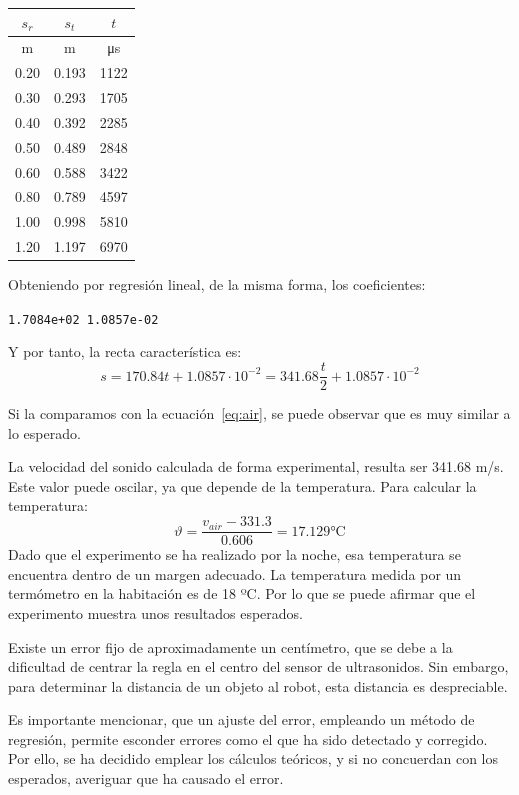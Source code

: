 \documentclass[10pt,a4paper,hidelinks]{article}
\begin{document}
\begin{multicols}{2}
\begin{center}
\begin{tabular}{ | c | c | c | }
\hline
$s_{r}$ & $s_{t}$ & $t$\\ \hline
m & m & \si{\micro\second} \\ \hline \hline
0.20 & 0.193 & 1122 \\ \hline
0.30 & 0.293 & 1705 \\ \hline
0.40 & 0.392 & 2285 \\ \hline
0.50 & 0.489 & 2848 \\ \hline
0.60 & 0.588 & 3422 \\ \hline
0.80 & 0.789 & 4597 \\ \hline
1.00 & 0.998 & 5810 \\ \hline
1.20 & 1.197 & 6970 \\ \hline
\end{tabular}
\end{center}

Obteniendo por regresión lineal, de la misma forma, los coeficientes:
\begin{center}
\texttt{1.7084e+02   1.0857e-02}
\end{center}
Y por tanto, la recta característica es:
$$ s = 170.84 t + 1.0857\cdot 10^{-2} = 341.68\frac{t}{2} + 1.0857\cdot 10^{-2}
$$

Si la comparamos con la ecuación~\ref{eq:air}, se puede observar que es muy 
similar a lo esperado.

La velocidad del sonido calculada de forma experimental, resulta ser 341.68 m/s.  
Este valor puede oscilar, ya que depende de la temperatura. Para calcular la 
temperatura:
$$ \vartheta = \frac{v_{air}-331.3}{0.606} = 17.129 \si{\celsius} $$
Dado que el experimento se ha realizado por la noche, esa temperatura se 
encuentra dentro de un margen adecuado. La temperatura medida por un termómetro 
en la habitación es de 18 ºC. Por lo que se puede afirmar que el experimento 
muestra unos resultados esperados.

Existe un error fijo de aproximadamente un centímetro, que se debe a la 
dificultad de centrar la regla en el centro del sensor de ultrasonidos. Sin 
embargo, para determinar la distancia de un objeto al robot, esta distancia es 
despreciable.

Es importante mencionar, que un ajuste del error, empleando un método de 
regresión, permite esconder errores como el que ha sido detectado y corregido.  
Por ello, se ha decidido emplear los cálculos teóricos, y si no concuerdan con 
los esperados, averiguar que ha causado el error.


\end{multicols}
\end{document}

